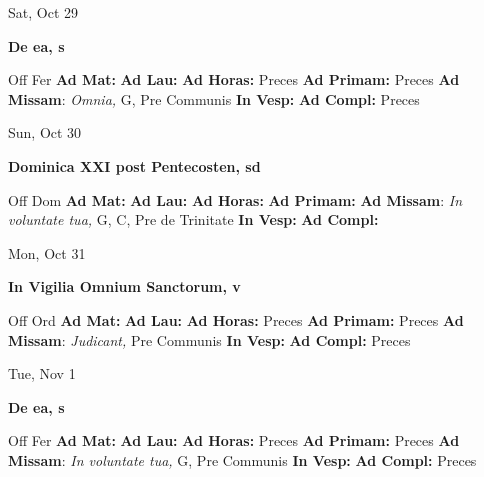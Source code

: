 \documentclass[10pt]{article}
\begin{document}
\begin{minipage}{3.5in}
\vspace{2em}\begin{center}
Sat, Oct 29
\end{center}\textbf{ \large De ea, \textnormal{\normalsize s}}
\begin{justify}
Off Fer
\textbf{Ad Mat: }
\textbf{Ad Lau: }
\textbf{Ad Horas: }Preces
\textbf{Ad Primam: }Preces
\textbf{Ad Missam}: \textit{Omnia,} G, Pre Communis
\textbf{In Vesp: }
\textbf{Ad Compl: }Preces\end{justify}
\end{minipage}



\begin{minipage}{3.5in}
\vspace{2em}\begin{center}
Sun, Oct 30
\end{center}\textbf{ \large Dominica XXI post Pentecosten, \textnormal{\normalsize sd}}
\begin{justify}
Off Dom
\textbf{Ad Mat: }
\textbf{Ad Lau: }
\textbf{Ad Horas: }
\textbf{Ad Primam: }
\textbf{Ad Missam}: \textit{In voluntate tua,} G, C, Pre de Trinitate
\textbf{In Vesp: }
\textbf{Ad Compl: }\end{justify}
\end{minipage}



\begin{minipage}{3.5in}
\vspace{2em}\begin{center}
Mon, Oct 31
\end{center}\textbf{ \large In Vigilia Omnium Sanctorum, \textnormal{\normalsize v}}
\begin{justify}
Off Ord
\textbf{Ad Mat: }
\textbf{Ad Lau: }
\textbf{Ad Horas: }Preces
\textbf{Ad Primam: }Preces
\textbf{Ad Missam}: \textit{Judicant,} Pre Communis
\textbf{In Vesp: }
\textbf{Ad Compl: }Preces\end{justify}
\end{minipage}



\begin{minipage}{3.5in}
\vspace{2em}\begin{center}
Tue, Nov 1
\end{center}\textbf{ \large De ea, \textnormal{\normalsize s}}
\begin{justify}
Off Fer
\textbf{Ad Mat: }
\textbf{Ad Lau: }
\textbf{Ad Horas: }Preces
\textbf{Ad Primam: }Preces
\textbf{Ad Missam}: \textit{In voluntate tua,} G, Pre Communis
\textbf{In Vesp: }
\textbf{Ad Compl: }Preces\end{justify}
\end{minipage}
\end{document}
